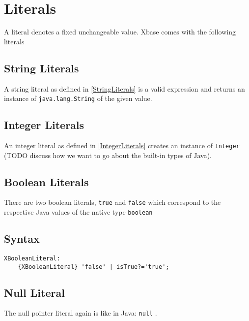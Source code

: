 \documentclass[a4paper,10pt]{scrreprt}
\begin{document}
\section{Literals\label{Literals}}
A literal denotes a fixed unchangeable value. Xbase comes with the following literals

\subsection{String Literals\label{ExpressionsStringLiterals}}
A string literal as defined in 
\autoref{StringLiterals} is a valid expression and returns an instance of \lstinline{java.lang.String}
 of the given value.




\subsection{Integer Literals\label{ExpressionsIntegerLiterals}}
An integer literal as defined in 
\autoref{IntegerLiterals} creates an instance of \lstinline{Integer}
 (TODO discuss how we want to go about the built-in types of Java).




\subsection{Boolean Literals\label{BooleanLiteral}}
There are two boolean literals, \lstinline{true}
 and \lstinline{false}
 which correspond to the respective Java values of the native type \lstinline{boolean}
 




\subsection{Syntax}
\begin{lstlisting}
XBooleanLiteral:
	{XBooleanLiteral} 'false' | isTrue?='true';

\end{lstlisting}





\subsection{Null Literal\label{NullLiteral}}
The null pointer literal again is like in Java: \lstinline{null}
. 
\end{document}
